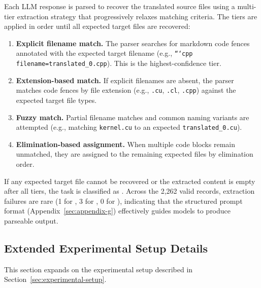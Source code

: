 Each LLM response is parsed to recover the translated source files using a multi-tier extraction strategy that progressively relaxes matching criteria. The tiers are applied in order until all expected target files are recovered:

\begin{enumerate}
    \item \textbf{Explicit filename match.} The parser searches for markdown code fences annotated with the expected target filename (e.g., \texttt{```cpp filename=translated\_0.cpp}). This is the highest-confidence tier.
    \item \textbf{Extension-based match.} If explicit filenames are absent, the parser matches code fences by file extension (e.g., \texttt{.cu}, \texttt{.cl}, \texttt{.cpp}) against the expected target file types.
    \item \textbf{Fuzzy match.} Partial filename matches and common naming variants are attempted (e.g., matching \texttt{kernel.cu} to an expected \texttt{translated\_0.cu}).
    \item \textbf{Elimination-based assignment.} When multiple code blocks remain unmatched, they are assigned to the remaining expected files by elimination order.
\end{enumerate}

If any expected target file cannot be recovered or the extracted content is empty after all tiers, the task is classified as \extractionfail{}. Across the 2{,}262 valid records, extraction failures are rare (1 for \qwenshort{}, 3 for \gptnew{}, 0 for \codex{}), indicating that the structured prompt format (Appendix~\ref{sec:appendix-g}) effectively guides models to produce parseable output.

\subsection{Extended Experimental Setup Details}
\label{sec:appendix-a-extended}

This section expands on the experimental setup described in Section~\ref{sec:experimental-setup}.

